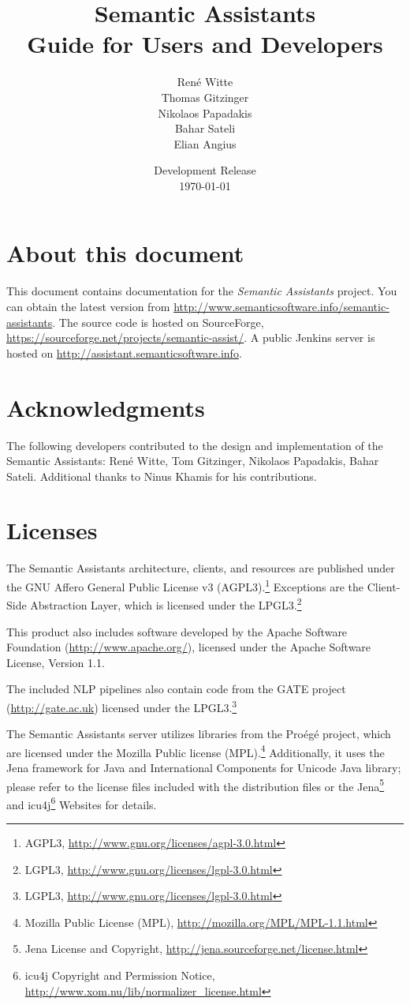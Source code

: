 \documentclass[10pt,twoside,openany,bibtotoc,liststotoc,chapterprefix]{scrbook}
\title{Semantic Assistants\bigskip\\
\Large Guide for Users and Developers}
\author{Ren\'{e} Witte\\
Thomas Gitzinger\\
Nikolaos Papadakis\\
Bahar Sateli\\
Elian Angius
\medskip}
\date{Development Release\\
\today
}
\begin{document}
\frontmatter
\maketitle

\tableofcontents

\section*{About this document}
This document contains documentation for the \emph{Semantic
  Assistants} project. You can obtain the latest version from
\url{http://www.semanticsoftware.info/semantic-assistants}. The source
code is hosted on SourceForge,
\url{https://sourceforge.net/projects/semantic-assist/}.  A public
Jenkins server is hosted on
\url{http://assistant.semanticsoftware.info}.

\section*{Acknowledgments}
The following developers contributed to the design and implementation
of the Semantic Assistants: Ren\'{e} Witte, Tom Gitzinger, Nikolaos
Papadakis, Bahar Sateli. Additional thanks to Ninus Khamis for
his contributions.

\section*{Licenses}
The Semantic Assistants architecture, clients, and resources are
published under the GNU Affero General Public License v3
(AGPL3).\footnote{AGPL3,
  \url{http://www.gnu.org/licenses/agpl-3.0.html}} Exceptions are the
Client-Side Abstraction Layer, which is licensed under the  LPGL3.\footnote{LGPL3, \url{http://www.gnu.org/licenses/lgpl-3.0.html}}

This product also includes software developed by the Apache Software
Foundation (\url{http://www.apache.org/}), licensed under the Apache
Software License, Version 1.1.

The included NLP pipelines also contain code from the GATE project
(\url{http://gate.ac.uk}) licensed under the LPGL3.\footnote{LGPL3, \url{http://www.gnu.org/licenses/lgpl-3.0.html}}

The Semantic Assistants server utilizes libraries from the Pro\'eg\'e
project, which are licensed under the Mozilla Public license
(MPL).\footnote{Mozilla Public License (MPL),
  \url{http://mozilla.org/MPL/MPL-1.1.html}} Additionally, it uses
the Jena framework for Java and International Components for Unicode Java library; please refer to the license files included with
the distribution files or the Jena\footnote{Jena License and
  Copyright, \url{http://jena.sourceforge.net/license.html}} and icu4j\footnote{icu4j Copyright and Permission Notice, \url{http://www.xom.nu/lib/normalizer_license.html}} Websites for details.

\mainmatter








\backmatter
\appendix


\end{document}
